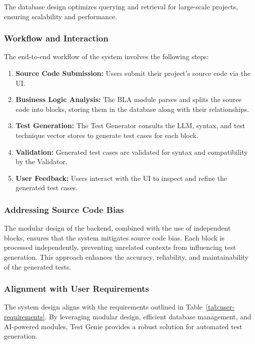 \hspace{0.5cm}The database design optimizes querying and retrieval for large-scale projects, ensuring scalability and performance.

\subsubsection{Workflow and Interaction}

\hspace{0.5cm}The end-to-end workflow of the system involves the following steps:
\begin{enumerate}
    \item \textbf{Source Code Submission:} Users submit their project's source code via the UI.
    \item \textbf{Business Logic Analysis:} The BLA module parses and splits the source code into blocks, storing them in the database along with their relationships.
    \item \textbf{Test Generation:} The Test Generator consults the LLM, syntax, and test technique vector stores to generate test cases for each block.
    \item \textbf{Validation:} Generated test cases are validated for syntax and compatibility by the Validator.
    \item \textbf{User Feedback:} Users interact with the UI to inspect and refine the generated test cases.
\end{enumerate}

\subsubsection{Addressing Source Code Bias}

\hspace{0.5cm}The modular design of the backend, combined with the use of independent blocks, ensures that the system mitigates source code bias. Each block is processed independently, preventing unrelated contexts from influencing test generation. This approach enhances the accuracy, reliability, and maintainability of the generated tests.

\subsubsection{Alignment with User Requirements}

\hspace{0.5cm}The system design aligns with the requirements outlined in Table~\ref{tab:user-requirements}. By leveraging modular design, efficient database management, and AI-powered modules, Test Genie provides a robust solution for automated test generation.

